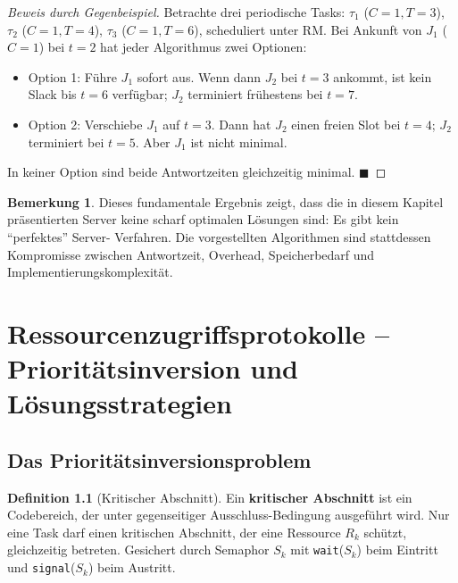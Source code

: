 ﻿\documentclass[a4paper,12pt]{report}
\theoremstyle{definition}
\newtheorem{definition}{Definition}[chapter]
\newtheorem{bemerkung}{Bemerkung}[chapter]
\begin{document}
\begin{proof}[Beweis durch Gegenbeispiel]
	Betrachte drei periodische Tasks: $\tau_1$ ($C=1, T=3$), $\tau_2$ ($C=1, T=4$),
	$\tau_3$ ($C=1, T=6$), scheduliert unter RM. Bei Ankunft von $J_1$ ($C=1$)
	bei $t=2$ hat jeder Algorithmus zwei Optionen:
	\begin{itemize}
		\item Option 1: Führe $J_1$ sofort aus. Wenn dann $J_2$ bei $t=3$ ankommt,
		      ist kein Slack bis $t=6$ verfügbar; $J_2$ terminiert frühestens bei $t=7$.
		\item Option 2: Verschiebe $J_1$ auf $t=3$. Dann hat $J_2$ einen freien
		      Slot bei $t=4$; $J_2$ terminiert bei $t=5$. Aber $J_1$ ist nicht minimal.
	\end{itemize}
	In keiner Option sind beide Antwortzeiten gleichzeitig minimal. \hfill$\blacksquare$
\end{proof}

\begin{bemerkung}
	Dieses fundamentale Ergebnis zeigt, dass die in diesem Kapitel präsentierten
	Server keine scharf optimalen Lösungen sind: Es gibt kein ``perfektes'' Server-
	Verfahren. Die vorgestellten Algorithmen sind stattdessen Kompromisse zwischen
	Antwortzeit, Overhead, Speicherbedarf und Implementierungskomplexität.
\end{bemerkung}

\chapter{Ressourcenzugriffsprotokolle -- Prioritätsinversion und Lösungsstrategien}
\label{chap:ressourcen}

\section{Das Prioritätsinversionsproblem}

\begin{definition}[Kritischer Abschnitt]
	Ein \textbf{kritischer Abschnitt} ist ein Codebereich, der unter gegenseitiger
	Ausschluss-Bedingung ausgeführt wird. Nur eine Task darf einen kritischen
	Abschnitt, der eine Ressource $R_k$ schützt, gleichzeitig betreten.
	Gesichert durch Semaphor $S_k$ mit \texttt{wait}($S_k$) beim Eintritt und
	\texttt{signal}($S_k$) beim Austritt.
\end{definition}
\end{document}
